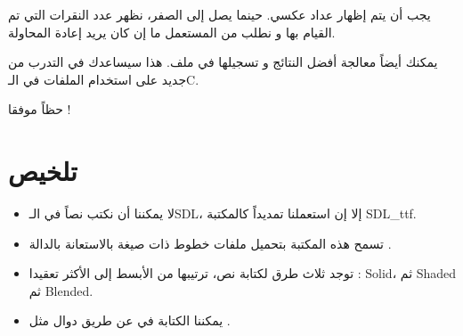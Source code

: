 يجب أن يتم إظهار عداد عكسي. حينما يصل إلى الصفر، نظهر عدد النقرات التي تم القيام بها و نطلب من المستعمل ما إن كان يريد إعادة المحاولة.

يمكنك أيضاً معالجة أفضل النتائج و تسجيلها في ملف. هذا سيساعدك في التدرب من جديد على استخدام الملفات في الـ\textenglish{C}.

حظاً موفقا !

\section*{تلخيص}

\begin{itemize}
	\item لا يمكننا أن نكتب نصاً في الـ\textenglish{SDL}،
	إلا إن استعملنا تمديداً كالمكتبة 
	\textenglish{SDL\_ttf}.
	\item تسمح هذه المكتبة بتحميل ملفات خطوط ذات صيغة 
	بالاستعانة بالدالة
	.
	\item توجد ثلاث طرق لكتابة نص، ترتيبها من الأبسط إلى الأكثر تعقيدا :
	\textenglish{Solid}،
	ثم
	\textenglish{Shaded}
	ثم
	\textenglish{Blended}.
	\item يمكننا الكتابة في
	عن طريق دوال مثل
	.
\end{itemize}
